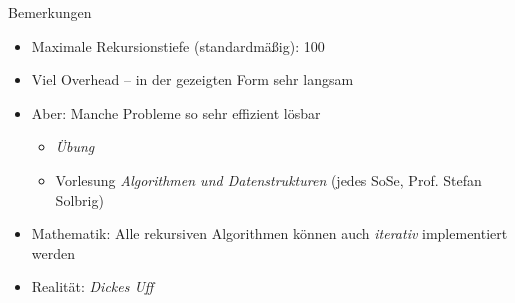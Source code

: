 
\begin{frame}[fragile]
%
	\begin{codebox}
		\begin{codebox}
			\begin{codebox}
				\begin{codebox}
				\scriptsize{}
				\end{codebox}
				\scriptsize{}
			\end{codebox}
			\scriptsize{}
		\end{codebox}
		\scriptsize{}
	\end{codebox}
%
\end{frame}



\begin{frame}{Bemerkungen}
%
\begin{itemize}
\item Maximale Rekursionstiefe (standardmäßig): 100
\item Viel Overhead -- in der gezeigten Form sehr langsam
\item Aber: Manche Probleme so sehr effizient lösbar 
	\begin{itemize}
	\item [\thus] \emph{Übung}
	\item [\thus] Vorlesung \emph{Algorithmen und Datenstrukturen} (jedes SoSe, Prof. Stefan Solbrig)
	\end{itemize}
\item Mathematik: Alle rekursiven Algorithmen können auch \emph{iterativ} implementiert werden
\item Realität: \emph{Dickes Uff}
\end{itemize}
%
\end{frame}